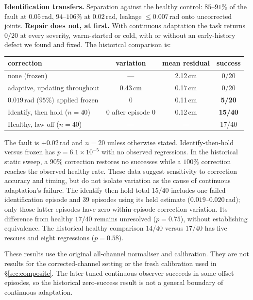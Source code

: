 \documentclass{article}
\begin{document}
\textbf{Identification transfers.} Separation against the healthy control: $85$--$91\%$ of
the fault at $0.05$\,rad, $94$--$106\%$ at $0.02$\,rad, leakage $\le0.007$\,rad onto
uncorrected joints. \textbf{Repair does not, at first.} With continuous adaptation the task
returns $0/20$ at every severity, warm-started or cold, with or without an early-history
defect we found and fixed. The historical comparison is:

\begin{center}\small
\begin{tabular}{lccc}
\toprule
correction & variation & mean residual & success \\
\midrule
none (frozen) & --- & 2.12\,cm & 0/20 \\
adaptive, updating throughout & 0.43\,cm & 0.17\,cm & 0/20 \\
$0.019$\,rad ($95\%$) applied frozen & 0 & 0.11\,cm & \textbf{5/20} \\
Identify, then hold ($n=40$) & 0 after episode 0 & 0.12\,cm & \textbf{15/40} \\
Healthy, law off ($n=40$) & --- & --- & 17/40 \\
\bottomrule
\end{tabular}
\end{center}

The fault is $+0.02$\,rad and $n=20$ unless otherwise stated. Identify-then-hold versus
frozen has $p=6.1\times10^{-5}$ with no observed regressions. In the historical static sweep, a $90\%$ correction restores no successes while a $100\%$
correction reaches the observed healthy rate. These data suggest sensitivity to correction
accuracy and timing, but do not isolate variation as the cause of continuous adaptation's
failure. The identify-then-hold total $15/40$ includes one failed identification episode
and 39 episodes using its held estimate ($0.019$--$0.020$\,rad); only those latter episodes
have zero within-episode correction variation. Its difference from healthy $17/40$ remains
unresolved ($p=0.75$), without establishing equivalence. The historical healthy comparison
$14/40$ versus $17/40$ has five rescues and eight regressions ($p=0.58$).

These results use the original all-channel normaliser and calibration. They are not
results for the corrected-channel setting or the fresh calibration used in
\S\ref{sec:composite}. The later tuned continuous observer succeeds in some offset episodes,
so the historical zero-success result is not a general boundary of continuous adaptation.
\end{document}
